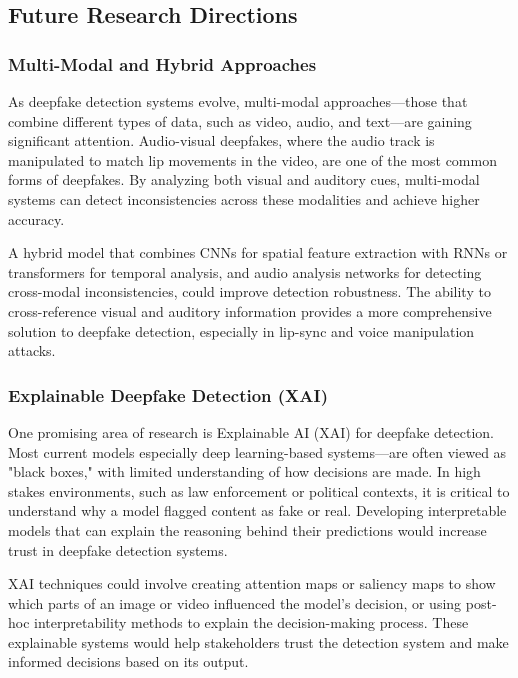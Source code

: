 \documentclass[lettersize,journal]{IEEEtran}
\begin{document}
\subsection{Future Research Directions}

\subsubsection{Multi-Modal and Hybrid Approaches}
As deepfake detection systems evolve, multi-modal approaches—those that combine different types of data, such as video, audio, and text—are gaining significant attention. Audio-visual deepfakes, where the audio track is manipulated to match lip movements in the video, are one of the most common forms of deepfakes. By analyzing both visual and auditory cues, multi-modal systems can detect inconsistencies across these modalities and achieve higher accuracy.\cite{xu2025localization}

A hybrid model that combines CNNs for spatial feature extraction with RNNs or transformers for temporal analysis, and audio analysis networks for detecting cross-modal inconsistencies, could improve detection robustness. The ability to cross-reference visual and auditory information provides a more comprehensive solution to deepfake detection, especially in lip-sync and voice manipulation attacks.

\subsubsection{Explainable Deepfake Detection (XAI)}

One promising area of research is Explainable AI (XAI) for deepfake detection. Most current models especially deep learning-based systems—are often viewed as "black boxes," with limited understanding of how decisions are made. In high stakes environments, such as law enforcement or political contexts, it is critical to understand why a model flagged content as fake or real. Developing interpretable models that can explain the reasoning behind their predictions would increase trust in deepfake detection systems.

XAI techniques could involve creating attention maps or saliency maps to show which parts of an image or video influenced the model’s decision, or using post-hoc interpretability methods to explain the decision-making process. These explainable systems would help stakeholders trust the detection system and make informed decisions based on its output.
\end{document}
